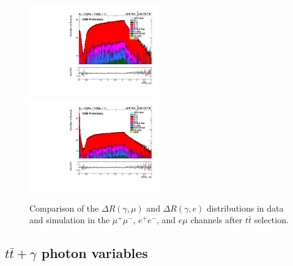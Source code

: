 \documentclass[oneside, a4paper, 11pt, ]{report}
\begin{document}
\begin{figure}
\includegraphics[width=0.5\textwidth]{Plots/ControlPlots/TTbarDiLeptonAnalysis/EMu/Photons/AllPhotons/Log/Photon_deltaR_muons_splitTTbar_ratio.pdf}
\includegraphics[width=0.5\textwidth]{Plots/ControlPlots/TTbarDiLeptonAnalysis/EMu/Photons/AllPhotons/Log/Photon_deltaR_electrons_splitTTbar_ratio.pdf}
\caption{Comparison of the $\Delta R(\gamma, \mu)$ and $\Delta R(\gamma, e)$ distributions in data and simulation in the $\mu^{+}\mu^{-}$, $e^{+}e^{-}$, and $e\mu$ channels after $t\bar{t}$ selection.}
\label{fig-ttbarDRmuonsAndDRelectrons}
\end{figure}

\subsection{$t\bar{t}+\gamma$ photon variables} \label{subsec-photonVariables}
\end{document}
